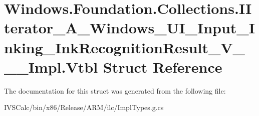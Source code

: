 \hypertarget{struct_windows_1_1_foundation_1_1_collections_1_1_i_iterator___a___windows___u_i___input___inkinb45199872c6b96532d23a1ae1d313b37}{}\section{Windows.\+Foundation.\+Collections.\+I\+Iterator\+\_\+\+A\+\_\+\+Windows\+\_\+\+U\+I\+\_\+\+Input\+\_\+\+Inking\+\_\+\+Ink\+Recognition\+Result\+\_\+\+V\+\_\+\+\_\+\+\_\+\+Impl.\+Vtbl Struct Reference}
\label{struct_windows_1_1_foundation_1_1_collections_1_1_i_iterator___a___windows___u_i___input___inkinb45199872c6b96532d23a1ae1d313b37}


The documentation for this struct was generated from the following file\+:\begin{DoxyCompactItemize}
\item 
I\+V\+S\+Calc/bin/x86/\+Release/\+A\+R\+M/ilc/Impl\+Types.\+g.\+cs\end{DoxyCompactItemize}
